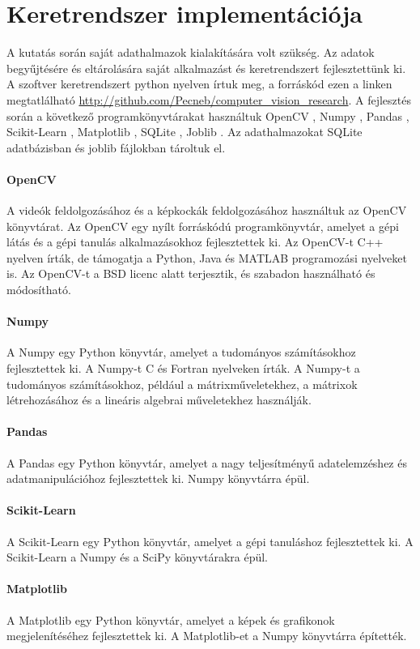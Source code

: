 \documentclass[12pt,a4paper]{article}
\begin{document}
\newpage
\section{Keretrendszer implementációja}
A kutatás során saját adathalmazok kialakítására volt szükség. Az adatok begyűjtésére és eltárolására saját alkalmazást és keretrendszert
fejlesztettünk ki. A szoftver keretrendszert python nyelven írtuk meg, a forráskód ezen a linken megtatlálható \url{http://github.com/Pecneb/computer_vision_research}.
A fejlesztés során a következő programkönyvtárakat használtuk OpenCV \cite{opencv_library}, Numpy \cite{harris2020array}, Pandas \cite{reback2020pandas},
Scikit-Learn \cite{scikit-learn}, Matplotlib \cite{Hunter:2007}, SQLite \cite{sqlite2020hipp}, Joblib \cite{joblib_library}. Az adathalmazokat SQLite adatbázisban és
joblib fájlokban tároltuk el. 
\paragraph{OpenCV} A videók feldolgozásához és a képkockák feldolgozásához használtuk az OpenCV könyvtárat. Az OpenCV egy nyílt forráskódú programkönyvtár, amelyet a gépi látás és a gépi tanulás alkalmazásokhoz fejlesztettek ki. Az OpenCV-t C++ nyelven írták, de támogatja a Python, Java és MATLAB programozási nyelveket is. Az OpenCV-t a BSD licenc alatt terjesztik, és szabadon használható és módosítható.
\paragraph{Numpy} A Numpy egy Python könyvtár, amelyet a tudományos számításokhoz fejlesztettek ki. A Numpy-t C és Fortran nyelveken írták. A Numpy-t a tudományos számításokhoz, például a mátrixműveletekhez, a mátrixok létrehozásához és a lineáris algebrai műveletekhez használják.
\paragraph{Pandas} A Pandas egy Python könyvtár, amelyet a nagy teljesítményű adatelemzéshez és adatmanipulációhoz fejlesztettek ki. Numpy könyvtárra épül.
\paragraph{Scikit-Learn} A Scikit-Learn egy Python könyvtár, amelyet a gépi tanuláshoz fejlesztettek ki. A Scikit-Learn a Numpy és a SciPy könyvtárakra épül.
\paragraph{Matplotlib} A Matplotlib egy Python könyvtár, amelyet a képek és grafikonok megjelenítéséhez fejlesztettek ki. A Matplotlib-et a Numpy könyvtárra építették.
\end{document}
